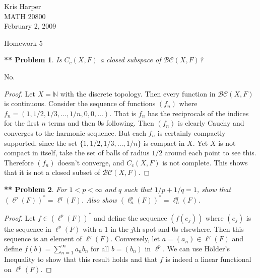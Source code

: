 \documentclass{article}
\newtheorem{**}{** Problem}
\begin{document}
\begin{flushright}
Kris Harper\\

MATH 20800\\

February 2, 2009
\end{flushright}

\begin{center}
Homework 5
\end{center}

\begin{flushleft}

\begin{**}
Is $C_c(X, F)$ a closed subspace of $\mathcal{BC} (X, F)$?
\end{**}

No.
\begin{proof}
Let $X = \mathbb{N}$ with the discrete topology. Then every function in $\mathcal{BC} (X, F)$ is continuous. Consider the sequence of functions $(f_n)$ where $f_n = (1, 1/2, 1/3, \dots , 1/n, 0, 0, \dots)$. That is $f_n$ has the reciprocals of the indices for the first $n$ terms and then $0$s following. Then $(f_n)$ is clearly Cauchy and converges to the harmonic sequence. But each $f_n$ is certainly compactly supported, since the set $\{1, 1/2, 1/3, \dots , 1/n\}$ is compact in $X$. Yet $X$ is not compact in itself, take the set of balls of radius $1/2$ around each point to see this. Therefore $(f_n)$ doesn't converge, and $C_c (X, F)$ is not complete. This shows that it is not a closed subset of $\mathcal{BC} (X, F)$.
\end{proof}

\begin{**}
For $1 < p < \infty$ and $q$ such that $1/p + 1/q = 1$, show that $(\ell^p (F))^* = \ell^q (F)$. Also show $(\ell_n^p (F))^* = \ell_n^q (F)$.
\end{**}
\begin{proof}
Let $f \in (\ell^p(F))^*$ and define the sequence $(f(e_j))$ where $(e_j)$ is the sequence in $\ell^p (F)$ with a $1$ in the $j$th spot and $0$s elsewhere. Then this sequence is an element of $\ell^q (F)$. Conversely, let $a = (a_n) \in \ell^q (F)$ and define $f(b) = \sum_{n=1}^{\infty} a_n b_n$ for all $b = (b_n)$ in $\ell^p$. We can use H\"{o}lder's Inequality to show that this result holds and that $f$ is indeed a linear functional on $\ell^p (F)$.
\end{proof}


\end{flushleft}
\end{document}
